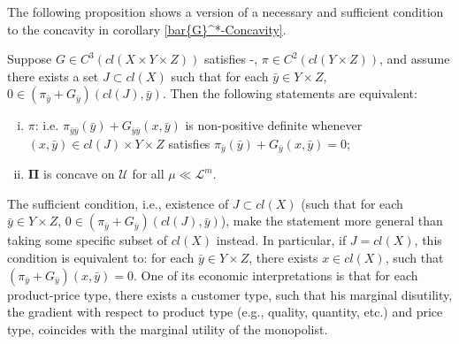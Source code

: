 The following proposition shows a version of a necessary and sufficient condition to the concavity in corollary \ref{bar{G}^*-Concavity}.\medskip


\begin{proposition}\label{bar{G}^*-Concavity2}
	Suppose $G \in C^3(cl(X\times Y \times Z)
	)$ satisfies \Gzero-\Gsix,  $\pi \in C^2( cl( Y \times Z)
	)$, and assume there exists a set $J\subset cl(X)$ such that for each $\bar{y}\in Y\times Z$, $ 0\in ( \pi_{\bar{y}}+G_{\bar{y}})(cl(J), \bar{y})$.  Then the following statements are equivalent:
	
	\begin{enumerate}[(i)]
		\item {} $\pi$: i.e. $\pi_{\bar{y}\bar{y}}(\bar{y}) + G_{\bar{y}\bar{y}}(x, \bar{y})$ is non-positive definite whenever
		$(x, \bar{y}) \in cl(J)\times Y \times Z$ satisfies $\pi_{\bar{y}}(\bar{y})+ G_{\bar{y}}(x, \bar{y})=0$;
		\item $\pmb \Pi$ is concave on $\mathcal{U}$ for all $\mu\ll \mathcal{L}^m$.
	\end{enumerate}
\end{proposition}

	

\begin{remark}
	The sufficient condition, i.e., existence of $J \subset cl(X)$ (such that for each  $\bar{y}\in Y\times Z$, $ 0\in ( \pi_{\bar{y}}+G_{\bar{y}})(cl(J), \bar{y})$), make the statement more general than taking some specific subset of $cl(X)$ instead. In particular, if $J=cl(X)$, this condition is equivalent to: for each $\bar{y} \in Y\times Z$, there exists $x \in cl(X)$, such that $( \pi_{\bar{y}}+G_{\bar{y}})(x, \bar{y}) = 0$. One of its economic interpretations is that for each product-price type, there exists a customer type, such that his marginal disutility, the gradient with respect to product type (e.g., quality, quantity, etc.) and price type, coincides with the marginal utility of the monopolist. 
\end{remark}

